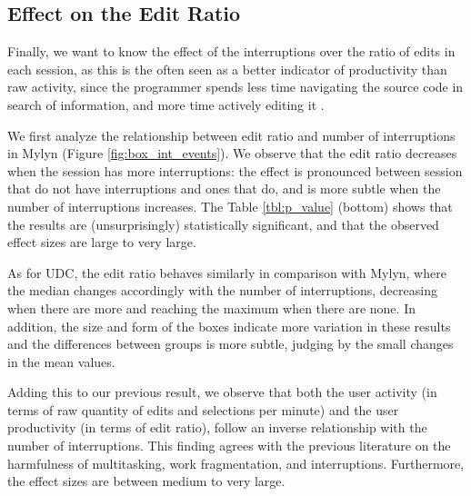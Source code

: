 \documentclass[times]{smrauth}
\begin{document}
\subsection{Effect on the Edit Ratio}
Finally, we want to know the effect of the interruptions over the ratio of edits in each session, as this is the often seen as a better indicator of productivity than raw activity, since the programmer spends less time navigating the source code in search of information, and more time actively editing it \cite{KM06}.

We first analyze the relationship between edit ratio and number of interruptions in Mylyn (Figure \ref{fig:box_int_events}). We observe that the edit ratio decreases when the session has more interruptions: the effect is pronounced between session that do not have interruptions and ones that do, and is more subtle when the number of interruptions increases. The Table \ref{tbl:p_value} (bottom) shows that the results are (unsurprisingly) statistically significant, and that the observed effect sizes are large to very large.

As for UDC, the edit ratio behaves similarly in comparison with Mylyn, where the median changes accordingly with the number of interruptions, decreasing when there are more and reaching the maximum when there are none. In addition, the size and form of the boxes indicate more variation in these results and the differences between groups is more subtle, judging by the small changes in the mean values.

Adding this to our previous result, we observe that both the user activity (in terms of raw quantity of edits and selections per minute) and the user productivity (in terms of edit ratio), follow an inverse relationship with the number of interruptions. This finding agrees with the previous literature on the harmfulness of multitasking, work fragmentation, and interruptions. Furthermore, the effect sizes are between medium to very large.

\end{document}
